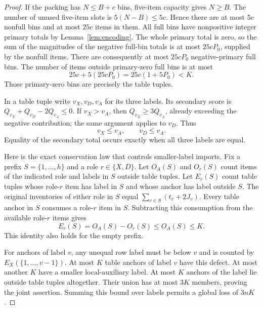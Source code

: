 \begin{proof}
If the packing has $N\le B+c$ bins, five-item capacity gives $N\ge B$.
The number of unused five-item slots is $5(N-B)\le5c$. Hence there
are at most $5c$ nonfull bins and at most $25c$ items in them. All full
bins have nonpositive integer primary totals by
Lemma~\ref{lem:encoding}. The whole primary total is zero, so the
sum of the magnitudes of the negative full-bin totals is at most
$25cP_0$, supplied by the nonfull items. There are consequently at most
$25cP_0$ negative-primary full bins. The number of items outside
primary-zero full bins is at most
\begin{equation}\label{eq:primary-loss}
 25c+5(25cP_0)=25c(1+5P_0)<K.
\end{equation}
Those primary-zero bins are precisely the table tuples.

In a table tuple write $v_X,v_D,v_A$ for its three labels. Its
secondary score is
$Q_{v_X}+Q_{v_D}-2Q_{v_A}\le0$. If $v_X>v_A$, then
$Q_{v_X}\ge3Q_{v_A}$, already exceeding the negative contribution;
the same argument applies to $v_D$. Thus
\[
 v_X\le v_A,\qquad v_D\le v_A.
\]
Equality of the secondary total occurs exactly when all three labels
are equal.

Here is the exact conservation law that controls smaller-label imports.
Fix a prefix $S=\{1,\ldots,h\}$ and a role $r\in\{X,D\}$.
Let $O_A(S)$ and $O_r(S)$ count items of the indicated role and labels
in $S$ outside table tuples. Let $E_r(S)$ count table tuples whose
role-$r$ item has label in $S$ and whose anchor has label outside $S$.
The original inventories of either role in $S$ equal
$\sum_{v\in S}(t_v+2J_v)$. Every table anchor in $S$ consumes a
role-$r$ item in $S$. Subtracting this consumption from the available
role-$r$ items gives
\begin{equation}\label{eq:label-prefix-conservation}
 E_r(S)=O_A(S)-O_r(S)\le O_A(S)\le K.
\end{equation}
This identity also holds for the empty prefix.

For anchors of label $v$, any unequal row label must be below $v$ and
is counted by $E_X(\{1,\ldots,v-1\})$. At most $K$ table anchors
of label $v$ have this defect. At most another $K$ have a smaller
local-auxiliary label. At most $K$ anchors of the label lie outside
table tuples altogether. Their union has at most $3K$ members, proving
the joint assertion. Summing this bound over labels permits a global
loss of $3nK$.
\end{proof}

